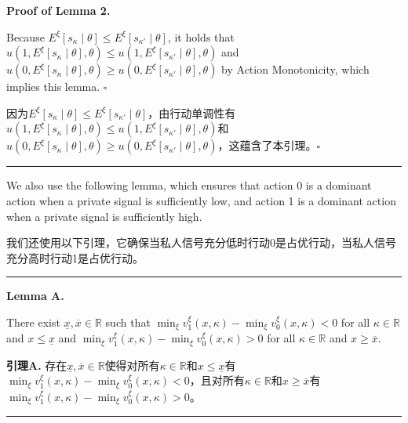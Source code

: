 \documentclass[12pt,a4paper]{article}
\newenvironment{original}
  {\par\medskip\noindent\color{black}\ignorespaces}
  {\par\medskip}
\newenvironment{translation}
  {\par\noindent\color{darkblue}\ignorespaces}
  {\par\medskip\noindent\hrule\par\medskip}
\theoremstyle{definition}
\theoremstyle{remark}
\begin{document}
\medskip
\noindent\textbf{Proof of Lemma 2.}
\begin{original}
Because $E^\xi[s_\kappa \mid \theta] \le E^\xi[s_{\kappa'} \mid \theta]$, it holds that $u(1, E^\xi[s_\kappa \mid \theta], \theta) \le u(1, E^\xi[s_{\kappa'} \mid \theta], \theta)$ and $u(0, E^\xi[s_\kappa \mid \theta], \theta) \ge u(0, E^\xi[s_{\kappa'} \mid \theta], \theta)$ by Action Monotonicity, which implies this lemma. $\square$
\end{original}
\begin{translation}
因为$E^\xi[s_\kappa \mid \theta] \le E^\xi[s_{\kappa'} \mid \theta]$，由行动单调性有$u(1, E^\xi[s_\kappa \mid \theta], \theta) \le u(1, E^\xi[s_{\kappa'} \mid \theta], \theta)$和$u(0, E^\xi[s_\kappa \mid \theta], \theta) \ge u(0, E^\xi[s_{\kappa'} \mid \theta], \theta)$，这蕴含了本引理。$\square$
\end{translation}

\medskip
\begin{original}
We also use the following lemma, which ensures that action 0 is a dominant action when a private signal is sufficiently low, and action 1 is a dominant action when a private signal is sufficiently high.
\end{original}
\begin{translation}
我们还使用以下引理，它确保当私人信号充分低时行动0是占优行动，当私人信号充分高时行动1是占优行动。
\end{translation}

\medskip
\noindent\textbf{Lemma A.}
\begin{original}
There exist $\underline{x}, \overline{x} \in \mathbb{R}$ such that $\min_{\xi} v_1^\xi(x, \kappa) - \min_{\xi} v_0^\xi(x, \kappa) < 0$ for all $\kappa \in \mathbb{R}$ and $x \le \underline{x}$ and $\min_{\xi} v_1^\xi(x, \kappa) - \min_{\xi} v_0^\xi(x, \kappa) > 0$ for all $\kappa \in \mathbb{R}$ and $x \ge \overline{x}$.
\end{original}
\begin{translation}
\color{darkblue}\textbf{引理A.} 存在$\underline{x}, \overline{x} \in \mathbb{R}$使得对所有$\kappa \in \mathbb{R}$和$x \le \underline{x}$有$\min_{\xi} v_1^\xi(x, \kappa) - \min_{\xi} v_0^\xi(x, \kappa) < 0$，且对所有$\kappa \in \mathbb{R}$和$x \ge \overline{x}$有$\min_{\xi} v_1^\xi(x, \kappa) - \min_{\xi} v_0^\xi(x, \kappa) > 0$。
\end{translation}
\end{document}

